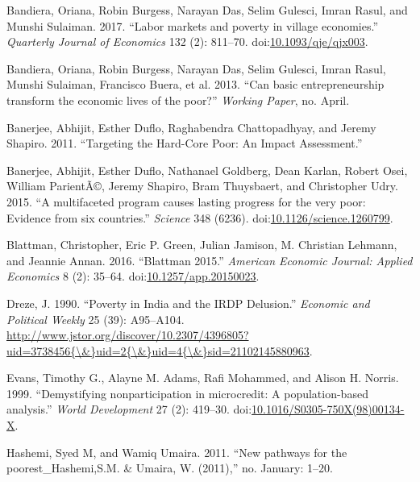 \documentclass[]{article}
\begin{document}
\hypertarget{ref-Bandiera2017}{}
Bandiera, Oriana, Robin Burgess, Narayan Das, Selim Gulesci, Imran
Rasul, and Munshi Sulaiman. 2017. ``Labor markets and poverty in village
economies.'' \emph{Quarterly Journal of Economics} 132 (2): 811--70.
doi:\href{https://doi.org/10.1093/qje/qjx003}{10.1093/qje/qjx003}.

\hypertarget{ref-Bandiera2013}{}
Bandiera, Oriana, Robin Burgess, Narayan Das, Selim Gulesci, Imran
Rasul, Munshi Sulaiman, Francisco Buera, et al. 2013. ``Can basic
entrepreneurship transform the economic lives of the poor?''
\emph{Working Paper}, no. April.

\hypertarget{ref-Voropaeva1966}{}
Banerjee, Abhijit, Esther Duflo, Raghabendra Chattopadhyay, and Jeremy
Shapiro. 2011. ``Targeting the Hard-Core Poor: An Impact Assessment.''

\hypertarget{ref-Banerjee2015}{}
Banerjee, Abhijit, Esther Duflo, Nathanael Goldberg, Dean Karlan, Robert
Osei, William ParientÃ©, Jeremy Shapiro, Bram Thuysbaert, and Christopher
Udry. 2015. ``A multifaceted program causes lasting progress for the
very poor: Evidence from six countries.'' \emph{Science} 348 (6236).
doi:\href{https://doi.org/10.1126/science.1260799}{10.1126/science.1260799}.

\hypertarget{ref-Blattman2016}{}
Blattman, Christopher, Eric P. Green, Julian Jamison, M. Christian
Lehmann, and Jeannie Annan. 2016. ``Blattman 2015.'' \emph{American
Economic Journal: Applied Economics} 8 (2): 35--64.
doi:\href{https://doi.org/10.1257/app.20150023}{10.1257/app.20150023}.

\hypertarget{ref-Dreze1990}{}
Dreze, J. 1990. ``Poverty in India and the IRDP Delusion.''
\emph{Economic and Political Weekly} 25 (39): A95--A104.
\href{http://www.jstor.org/discover/10.2307/4396805?uid=3738456\%7B/\&\%7Duid=2\%7B/\&\%7Duid=4\%7B/\&\%7Dsid=21102145880963}{http://www.jstor.org/discover/10.2307/4396805?uid=3738456\{\textbackslash{}\&\}uid=2\{\textbackslash{}\&\}uid=4\{\textbackslash{}\&\}sid=21102145880963}.

\hypertarget{ref-Evans1999}{}
Evans, Timothy G., Alayne M. Adams, Rafi Mohammed, and Alison H. Norris.
1999. ``Demystifying nonparticipation in microcredit: A population-based
analysis.'' \emph{World Development} 27 (2): 419--30.
doi:\href{https://doi.org/10.1016/S0305-750X(98)00134-X}{10.1016/S0305-750X(98)00134-X}.

\hypertarget{ref-Hashemi2011}{}
Hashemi, Syed M, and Wamiq Umaira. 2011. ``New pathways for the
poorest\_Hashemi,S.M. \& Umaira, W. (2011),'' no. January: 1--20.
\end{document}
